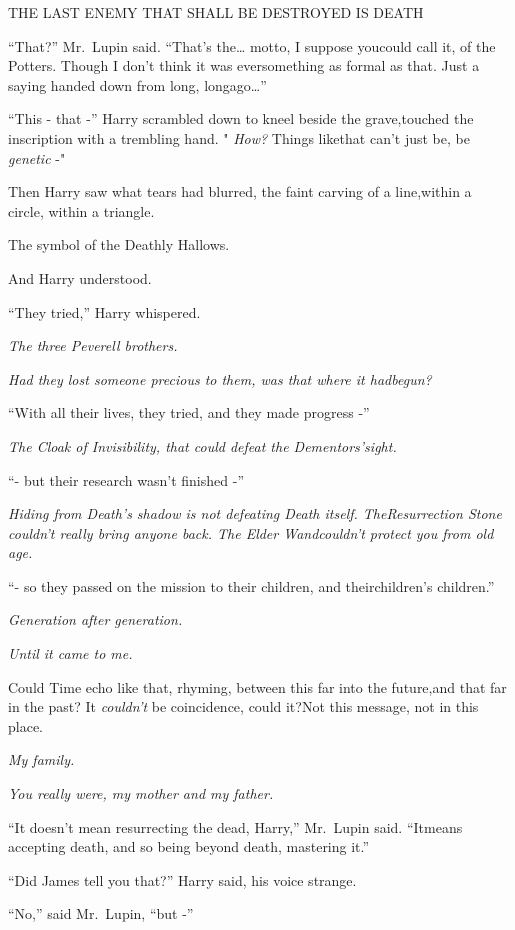 THE LAST ENEMY THAT SHALL BE DESTROYED IS DEATH

``That?'' Mr.~Lupin said. ``That's the\ldots{} motto, I suppose youcould call it, of the Potters. Though I don't think it was eversomething as formal as that. Just a saying handed down from long, longago\ldots{}''

``This - that -'' Harry scrambled down to kneel beside the grave,touched the inscription with a trembling hand. " \emph{How?} Things likethat can't just be, be \emph{genetic} -"

Then Harry saw what tears had blurred, the faint carving of a line,within a circle, within a triangle.

The symbol of the Deathly Hallows.

And Harry understood.

``They tried,'' Harry whispered.

\emph{The three Peverell brothers.}

\emph{Had they lost someone precious to them, was that where it hadbegun?}

``With all their lives, they tried, and they made progress -''

\emph{The Cloak of Invisibility, that could defeat the Dementors'sight.}

``- but their research wasn't finished -''

\emph{Hiding from Death's shadow is not defeating Death itself. TheResurrection Stone couldn't really bring anyone back. The Elder Wandcouldn't protect you from old age.}

``- so they passed on the mission to their children, and theirchildren's children.''

\emph{Generation after generation.}

\emph{Until it came to me.}

Could Time echo like that, rhyming, between this far into the future,and that far in the past? It \emph{couldn't} be coincidence, could it?Not this message, not in this place.

\emph{My family.}

\emph{You really were, my mother and my father.}

``It doesn't mean resurrecting the dead, Harry,'' Mr.~Lupin said. ``Itmeans accepting death, and so being beyond death, mastering it.''

``Did James tell you that?'' Harry said, his voice strange.

``No,'' said Mr.~Lupin, ``but -''

